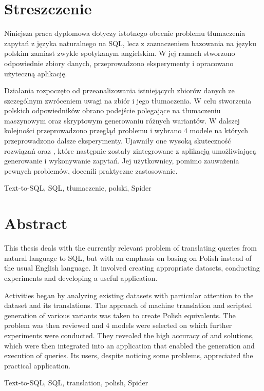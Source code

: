\section*{Streszczenie}
\vspace{1cm}

Niniejsza praca dyplomowa dotyczy istotnego obecnie problemu tłumaczenia zapytań z języka naturalnego na SQL, lecz z zaznaczeniem bazowania na języku polskim zamiast zwykle spotykanym angielskim. W jej ramach stworzono odpowiednie zbiory danych, przeprowadzono eksperymenty i opracowano użyteczną aplikację.

Działania rozpoczęto od przeanalizowania istniejących zbiorów danych ze szczególnym zwróceniem uwagi na zbiór  i jego tłumaczenia. W celu stworzenia polskich odpowiedników obrano podejście polegające na tłumaczeniu maszynowym oraz skryptowym generowaniu różnych wariantów. W dalszej kolejności przeprowadzono przegląd problemu  i wybrano 4 modele na których przeprowadzono dalsze eksperymenty. Ujawniły one wysoką skuteczność rozwiązań  oraz , które następnie zostały zintegrowane z aplikacją umożliwiającą generowanie i wykonywanie zapytań. Jej użytkownicy, pomimo zauważenia pewnych problemów, docenili praktyczne zastosowanie.

\vspace{1cm}
Text-to-SQL, SQL, tłumaczenie, polski, Spider
\clearpage

\section*{Abstract}
\vspace{1cm}

This thesis deals with the currently relevant problem of translating queries from natural language to SQL, but with an emphasis on basing on Polish instead of the usual English language. It involved creating appropriate datasets, conducting experiments and developing a useful application.

Activities began by analyzing existing datasets with particular attention to the  dataset and its translations. The approach of machine translation and scripted generation of various variants was taken to create Polish equivalents. The  problem was then reviewed and 4 models were selected on which further experiments were conducted. They revealed the high accuracy of  and  solutions, which were then integrated into an application that enabled the generation and execution of queries. Its users, despite noticing some problems, appreciated the practical application.

\vspace{1cm}
Text-to-SQL, SQL, translation, polish, Spider
\clearpage
